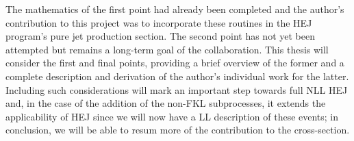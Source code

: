 The mathematics of the first point had already been completed and the author's contribution to this project was to incorporate these routines in the HEJ program's pure jet production section. The second point has not yet been attempted but remains a long-term goal of the collaboration. This thesis will consider the first and final points, providing a brief overview of the former and a complete description and derivation of the author's individual work for the latter. Including such considerations will mark an important step towards full NLL HEJ and, in the case of the addition of the non-FKL subprocesses, it extends the applicability of HEJ since we will now have a LL description of these events; in conclusion, we will be able to resum more of the contribution to the cross-section. 

